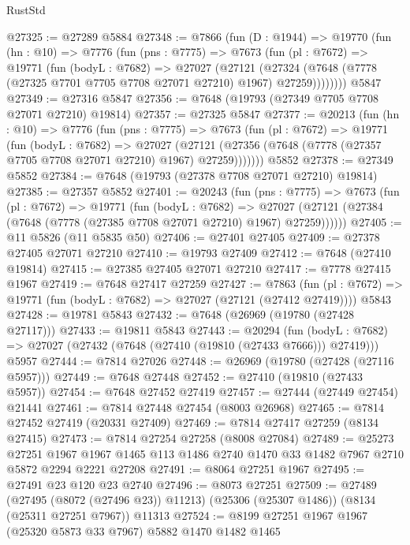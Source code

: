 \begin{lexlean}{RustStd}
\begin{coremodule}
@27325 := @27289 @5884
@27348 := @7866
    (fun (D : @1944) =>
    @19770
      (fun (hn : @10) =>
      @7776
        (fun (pns : @7775) =>
        @7673
          (fun (pl : @7672) =>
          @19771
            (fun (bodyL : @7682) =>
            @27027
              (@27121
                (@27324 (@7648 (@7778 (@27325 @7701 @7705 @7708 @27071 @27210) @1967) @27259))))))))
    @5847
@27349 := @27316 @5847
@27356 := @7648 (@19793 (@27349 @7705 @7708 @27071 @27210) @19814)
@27357 := @27325 @5847
@27377 := @20213
    (fun (hn : @10) =>
    @7776
      (fun (pns : @7775) =>
      @7673
        (fun (pl : @7672) =>
        @19771
          (fun (bodyL : @7682) =>
          @27027
            (@27121 (@27356 (@7648 (@7778 (@27357 @7705 @7708 @27071 @27210) @1967) @27259)))))))
    @5852
@27378 := @27349 @5852
@27384 := @7648 (@19793 (@27378 @7708 @27071 @27210) @19814)
@27385 := @27357 @5852
@27401 := @20243
    (fun (pns : @7775) =>
    @7673
      (fun (pl : @7672) =>
      @19771
        (fun (bodyL : @7682) =>
        @27027 (@27121 (@27384 (@7648 (@7778 (@27385 @7708 @27071 @27210) @1967) @27259))))))
@27405 := @11 @5826 (@11 @5835 @50)
@27406 := @27401 @27405
@27409 := @27378 @27405 @27071 @27210
@27410 := @19793 @27409
@27412 := @7648 (@27410 @19814)
@27415 := @27385 @27405 @27071 @27210
@27417 := @7778 @27415 @1967
@27419 := @7648 @27417 @27259
@27427 := @7863
    (fun (pl : @7672) => @19771 (fun (bodyL : @7682) => @27027 (@27121 (@27412 @27419))))
    @5843
@27428 := @19781 @5843
@27432 := @7648 (@26969 (@19780 (@27428 @27117)))
@27433 := @19811 @5843
@27443 := @20294
    (fun (bodyL : @7682) => @27027 (@27432 (@7648 (@27410 (@19810 (@27433 @7666))) @27419)))
    @5957
@27444 := @7814 @27026
@27448 := @26969 (@19780 (@27428 (@27116 @5957)))
@27449 := @7648 @27448
@27452 := @27410 (@19810 (@27433 @5957))
@27454 := @7648 @27452 @27419
@27457 := @27444 (@27449 @27454) @21441
@27461 := @7814 @27448 @27454 (@8003 @26968)
@27465 := @7814 @27452 @27419 (@20331 @27409)
@27469 := @7814 @27417 @27259 (@8134 @27415)
@27473 := @7814 @27254 @27258 (@8008 @27084)
@27489 := @25273
    @27251
    @1967
    @1967
    @1465
    @113
    @1486
    @2740
    @1470
    @33
    @1482
    @7967
    @2710
    @5872
    @2294
    @2221
    @27208
@27491 := @8064 @27251 @1967
@27495 := @27491 @23 @120 @23 @2740
@27496 := @8073 @27251
@27509 := @27489
    (@27495 (@8072 (@27496 @23)) @11213)
    (@25306 (@25307 @1486))
    (@8134 (@25311 @27251 @7967))
    @11313
@27524 := @8199
    @27251
    @1967
    @1967
    (@25320 @5873 @33 @7967)
    @5882
    @1470
    @1482
    @1465

\end{coremodule}
\end{lexlean}
